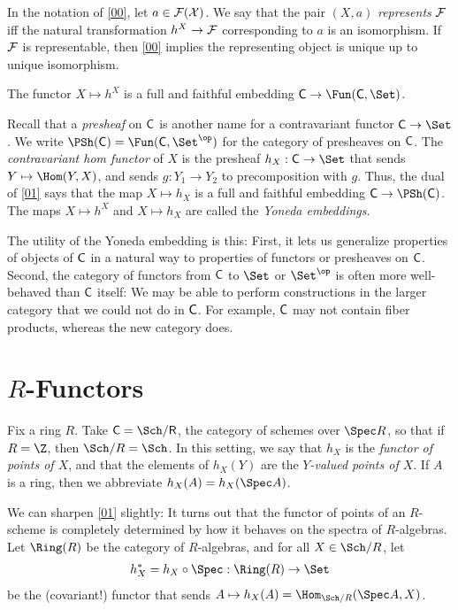 \documentclass[10pt,oneside,final]{amsart}
\begin{document}
In the notation of \ref{00}, let $a \in \cal{F}(X)$.
We say that the pair $(X, a)$ \emph{represents} $\cal{F}$ iff the natural transformation $h^X \to \cal{F}$ corresponding to $a$ is an isomorphism.
If $\cal{F}$ is representable, then \ref{00} implies the representing object is unique up to unique isomorphism.

\begin{cor}\label{01}
The functor $X \mapsto h^X$ is a full and faithful embedding $\sf{C} \to \Fun(\sf{C}, \Set)$.
\end{cor}

Recall that a \emph{presheaf} on $\sf{C}$ is another name for a contravariant functor $\sf{C} \to \Set$.
We write $\PSh(\sf{C}) = \Fun(\sf{C}, \Set^\op)$ for the category of presheaves on $\sf{C}$.
The \emph{contravariant hom functor} of $X$ is the presheaf $h_X : \sf{C} \to \Set$ that sends $Y \mapsto \Hom(Y, X)$, and sends $g : Y_1 \to Y_2$ to precomposition with $g$.
Thus, the dual of \ref{01} says that the map $X \mapsto h_X$ is a full and faithful embedding $\sf{C} \to \PSh(\sf{C})$.
The maps $X \mapsto h^X$ and $X \mapsto h_X$ are called the \emph{Yoneda embeddings}.

The utility of the Yoneda embedding is this:
First, it lets us generalize properties of objects of $\sf{C}$ in a natural way to properties of functors or presheaves on $\sf{C}$.
Second, the category of functors from $\sf{C}$ to $\Set$ or $\Set^\op$ is often more well-behaved than $\sf{C}$ itself: 
We may be able to perform constructions in the larger category that we could not do in $\sf{C}$.
For example, $\sf{C}$ may not contain fiber products, whereas the new category does.

\section{$R$-Functors}

Fix a ring $R$.
Take $\sf{C} = \Sch/R$, the category of schemes over $\Spec R$, so that if $R = \Z$, then $\Sch/R = \Sch$.
In this setting, we say that $h_X$ is the \emph{functor of points of $X$}, and that the elements of $h_X(Y)$ are the \emph{$Y$-valued points of $X$}.
If $A$ is a ring, then we abbreviate $h_X(A) = h_X(\Spec A)$.

We can sharpen \ref{01} slightly:
It turns out that the functor of points of an $R$-scheme is completely determined by how it behaves on the spectra of $R$-algebras.
Let $\Ring(R)$ be the category of $R$-algebras, and for all $X \in \Sch/R$, let
\begin{align}
h_X^\ast = h_X \circ \Spec : \Ring(R) \to \Set
\end{align}
be the (covariant!) functor that sends $A \mapsto h_X(A) = \Hom_{\Sch/R}(\Spec A, X)$.
\end{document}
